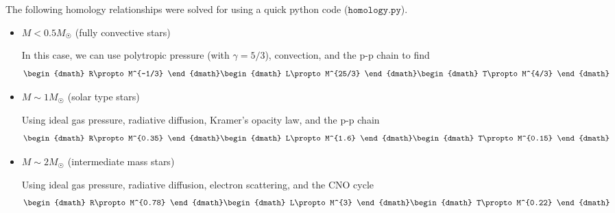 The following homology relationships were solved for using a quick python code
($\texttt{homology.py}$).
\begin{itemize}
    \item $M < 0.5M_\astrosun$ (fully convective stars)

          In this case, we can use polytropic pressure (with $\gamma=5/3$), convection, and
          the p-p chain to find
          \begin{dgroup}
          \begin{dmath}
            R\propto M^{-1/3}
          \end{dmath}
          \begin{dmath}
            L\propto M^{25/3}
          \end{dmath}
          \begin{dmath}
            T\propto M^{4/3}
          \end{dmath}
          \end{dgroup}

    \item $M\sim1M_\astrosun$ (solar type stars)

          Using ideal gas pressure, radiative diffusion, Kramer's opacity law, and the p-p chain
          \begin{dgroup}
          \begin{dmath}
            R\propto M^{0.35}
          \end{dmath}
          \begin{dmath}
            L\propto M^{1.6}
          \end{dmath}
          \begin{dmath}
            T\propto M^{0.15}
          \end{dmath}
          \end{dgroup}

    \item $M\sim2M_\astrosun$ (intermediate mass stars)

          Using ideal gas pressure, radiative diffusion, electron scattering, and the CNO cycle
          \begin{dgroup}
          \begin{dmath}
            R\propto M^{0.78}
          \end{dmath}
          \begin{dmath}
            L\propto M^{3}
          \end{dmath}
          \begin{dmath}
            T\propto M^{0.22}
          \end{dmath}
          \end{dgroup}


\end{itemize}
